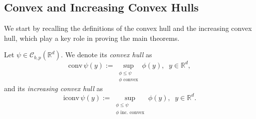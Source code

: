 \documentclass[reqno, a4paper]{amsart}
\newcommand{\ld}{\preceq_{E}}
\newtheorem{theorem}{Theorem}[section]
\newcommand{\conv}{\mathrm{conv}\,}
\newcommand{\iconv}{\mathrm{iconv}\,}
\newcommand{\PP}{\mathcal{P}}
\newcommand{\R}{\mathbb R}
\theoremstyle{definition}
\theoremstyle{definition}
\theoremstyle{definition}
\begin{document}


\subsection{Convex and Increasing Convex Hulls}
 We start by recalling the definitions of the convex hull and the increasing convex hull, which play a key role in proving the main theorems.

    Let $\psi\in{\mathcal{C}}_{b,p}(\R^d)$. We denote its \textit{convex hull} as 
    $$\conv\psi(y):=\sup_{ \substack{\phi\le\psi \\ \phi \text{ convex}}} \phi(y), \;\; y\in\R^d,$$
and its \textit{increasing convex hull} as 
    $$\iconv\psi(y):=\sup_{ \substack{\phi\le\psi \\ \phi \text{ inc. convex}}} \phi(y), \;\; y\in\R^d.$$



    
\end{document}
